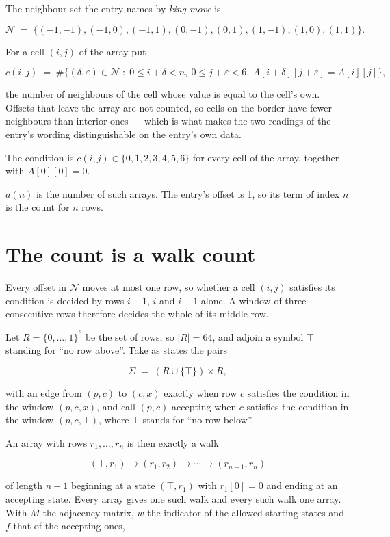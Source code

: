\documentclass[11pt]{article}
\theoremstyle{definition}
\begin{document}
The neighbour set the entry names by {\itshape king-move} is

\[\mathcal{N} \;=\; \{(-1,-1), (-1,0), (-1,1), (0,-1), (0,1), (1,-1), (1,0), (1,1)\}.\]

For a cell $(i,j)$ of the array put

\[c(i,j) \;=\; \#\bigl\{(\delta,\varepsilon)\in\mathcal{N} \;:\; 0\le i+\delta<n,\ 0\le j+\varepsilon<6,\ A[i+\delta][j+\varepsilon] = A[i][j]\bigr\},\]

the number of neighbours of the cell whose value is equal to the cell's own. Offsets that leave the array are not counted, so cells on the border have fewer neighbours than interior ones --- which is what makes the two readings of the entry's wording distinguishable on the entry's own data.

The condition is $c(i,j) \in \{0, 1, 2, 3, 4, 5, 6\}$ for every cell of the array, together with $A[0][0]=0$.

$a(n)$ is the number of such arrays. The entry's offset is 1, so its term of index $n$ is the count for $n$ rows.

\section{The count is a walk count}

Every offset in $\mathcal{N}$ moves at most one row, so whether a cell $(i,j)$ satisfies its condition is decided by rows $i-1$, $i$ and $i+1$ alone. A window of three consecutive rows therefore decides the whole of its middle row.

Let $R = \{0,\dots,1\}^{6}$ be the set of rows, so $|R| = 64$, and adjoin a symbol $\top$ standing for ``no row above''. Take as states the pairs

\[\Sigma \;=\; (R \cup \{\top\}) \times R,\]

with an edge from $(p,c)$ to $(c,x)$ exactly when row $c$ satisfies the condition in the window $(p,c,x)$, and call $(p,c)$ accepting when $c$ satisfies the condition in the window $(p,c,\bot)$, where $\bot$ stands for ``no row below''.

An array with rows $r_1,\dots,r_n$ is then exactly a walk

\[(\top,r_1) \to (r_1,r_2) \to \cdots \to (r_{n-1},r_n)\]

of length $n-1$ beginning at a state $(\top,r_1)$ with $r_1[0]=0$ and ending at an accepting state. Every array gives one such walk and every such walk one array. With $M$ the adjacency matrix, $w$ the indicator of the allowed starting states and $f$ that of the accepting ones,
\end{document}
